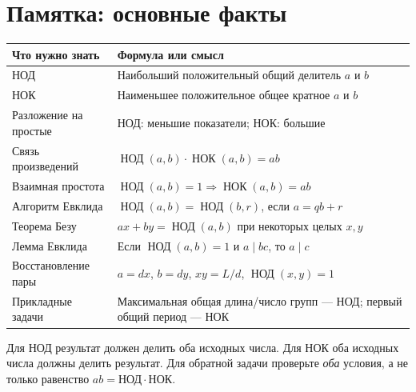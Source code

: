 \documentclass[11pt,a4paper]{article}
\newcommand{\gcdru}[2]{\mathop{\text{НОД}}\nolimits(#1,#2)}
\newcommand{\lcmru}[2]{\mathop{\text{НОК}}\nolimits(#1,#2)}
\newcommand{\concept}[1]{\par\needspace{4\baselineskip}{\color{navy}\bfseries #1.}\enspace}
\begin{document}
\clearpage\section*{Памятка: основные факты}
\begin{center}
\small\begin{tabularx}{\linewidth}{>{\raggedright\arraybackslash}p{43mm}X}\toprule
\textbf{Что нужно знать}&\textbf{Формула или смысл}\\\midrule
НОД&Наибольший положительный общий делитель $a$ и $b$\\
НОК&Наименьшее положительное общее кратное $a$ и $b$\\
Разложение на простые&НОД: меньшие показатели; НОК: большие\\
Связь произведений&$\gcdru{a}{b}\cdot\lcmru{a}{b}=ab$\\
Взаимная простота&$\gcdru{a}{b}=1\Longrightarrow\lcmru{a}{b}=ab$\\
Алгоритм Евклида&$\gcdru{a}{b}=\gcdru{b}{r}$, если $a=qb+r$\\
Теорема Безу&$ax+by=\gcdru{a}{b}$ при некоторых целых $x,y$\\
Лемма Евклида&Если $\gcdru{a}{b}=1$ и $a\mid bc$, то $a\mid c$\\
Восстановление пары&$a=dx$, $b=dy$, $xy=L/d$, $\gcdru{x}{y}=1$\\
Прикладные задачи&Максимальная общая длина/число групп --- НОД; первый общий период --- НОК\\\bottomrule
\end{tabularx}
\end{center}
\concept{Самопроверка} Для НОД результат должен делить оба исходных числа. Для НОК оба исходных числа должны делить результат. Для обратной задачи проверьте \emph{оба} условия, а не только равенство $ab=\text{НОД}\cdot\text{НОК}$.
\end{document}

